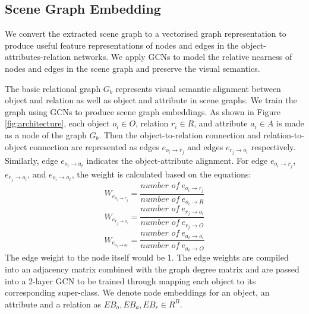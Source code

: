 \documentclass[11pt]{article}
\begin{document}
\subsection{Scene Graph Embedding}
We convert the extracted scene graph to a vectorised graph representation to produce useful feature representations of nodes and edges in the object-attributes-relation networks. We apply GCNs to model the relative nearness of nodes and edges in the scene graph and preserve the visual semantics.

The basic relational graph $G_{b}$ represents visual semantic alignment between object and relation as well as object and attribute in scene graphs. We train the graph using GCNs to produce scene graph embeddings. As shown in Figure \ref{fig:architecture}, each object $o_{i}\in O$, relation $r_{i}\in R$, and attribute $a_{i}\in A$ is made as a node of the graph $G_{b}$. Then the object-to-relation connection and relation-to-object connection are represented as edges $e_{o_{i}\to r_{j}}$ and edges $e_{r_{j}\to o_{i}}$ respectively. Similarly, edge $e_{o_{i}\to a_{t}}$ indicates the object-attribute alignment. For edge $e_{o_{i}\to r_{j}}$, $e_{r_{j}\to o_{i}}$, and $e_{o_{i}\to a_{t}}$, the weight is calculated based on the equations:
\begin{equation}
    W_{e_{o_{i}\to r_{j}}} = \frac{\textit{number of}\ e_{o_{i}\to r_{j}}}{\textit{number of}\ e_{o_{i}\to R}}
\end{equation}
\begin{equation}
    W_{e_{r_{j}\to o_{i}}} = \frac{\textit{number of}\ e_{r_{j}\to o_{i}}}{\textit{number of}\ e_{r_{j}\to O}}
\end{equation}
\begin{equation}
    W_{e_{o_{i}\to a_{t}}} = \frac{\textit{number of}\ e_{a_{t}\to o_{i}}}{\textit{number of}\ e_{a_{t}\to O}}
\end{equation}
The edge weight to the node itself would be 1. The edge weights are compiled into an adjacency matrix combined with the graph degree matrix and are passed into a 2-layer GCN to be trained through mapping each object to its corresponding super-class. We denote node embeddings for an object, an attribute and a relation as $EB_{o},EB_{a},EB_{r}\in R^{B}$.
\end{document}
